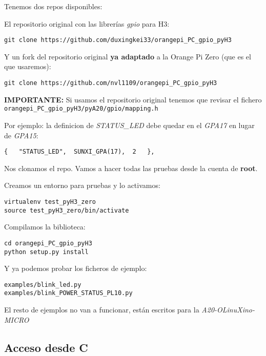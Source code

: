 \documentclass[12pt,spanish,]{scrartcl}
\begin{document}
Tenemos dos repos disponibles:

El repositorio original con las librerías \emph{gpio} para H3:

\begin{verbatim}
git clone https://github.com/duxingkei33/orangepi_PC_gpio_pyH3
\end{verbatim}

Y un fork del repositorio original \textbf{ya adaptado} a la Orange Pi
Zero (que es el que usaremos):

\begin{verbatim}
git clone https://github.com/nvl1109/orangepi_PC_gpio_pyH3
\end{verbatim}

\textbf{IMPORTANTE:} Si usamos el repositorio original tenemos que
revisar el fichero
\texttt{orangepi\_PC\_gpio\_pyH3/pyA20/gpio/mapping.h}

Por ejemplo: la definicion de \emph{STATUS\_LED} debe quedar en el
\emph{GPA17} en lugar de \emph{GPA15}:

\begin{verbatim}
{   "STATUS_LED",  SUNXI_GPA(17),  2   },
\end{verbatim}

Nos clonamos el repo. Vamos a hacer todas las pruebas desde la cuenta de
\textbf{root}.

Creamos un entorno para pruebas y lo activamos:

\begin{verbatim}
virtualenv test_pyH3_zero
source test_pyH3_zero/bin/activate
\end{verbatim}

Compilamos la biblioteca:

\begin{verbatim}
cd orangepi_PC_gpio_pyH3
python setup.py install
\end{verbatim}

Y ya podemos probar los ficheros de ejemplo:

\begin{verbatim}
examples/blink_led.py
examples/blink_POWER_STATUS_PL10.py
\end{verbatim}

El resto de ejemplos no van a funcionar, están escritos para la
\emph{A20-OLinuXino-MICRO}

\hypertarget{acceso-desde-c}{%
\subsection{Acceso desde C}\label{acceso-desde-c}}
\end{document}
